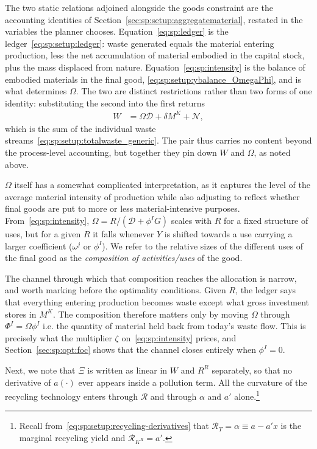 The two static relations adjoined alongside the goods constraint are the accounting identities of Section~\ref{sec:sp:setup:aggregatematerial}, restated in the variables the planner chooses. Equation~\eqref{eq:sp:ledger} is the ledger~\eqref{eq:sp:setup:ledger}: waste generated equals the material entering production, less the net accumulation of material embodied in the capital stock, plus the mass displaced from nature. Equation~\eqref{eq:sp:intensity} is the balance of embodied materials in the final good, \eqref{eq:sp:setup:ybalance_OmegaPhi}, and is what determines $\Omega$. The two are distinct restrictions rather than two forms of one identity: substituting the second into the first returns
\begin{align}
W &= \Omega\mathcal D+\delta M^K+\mathcal N,
\label{eq:sp:ledger-streams}
\end{align}
which is the sum of the individual waste streams~\eqref{eq:sp:setup:totalwaste_generic}. The pair thus carries no content beyond the process-level accounting, but together they pin down $W$ and $\Omega$, as noted above.

$\Omega$ itself has a somewhat complicated interpretation, as it captures the level of the average material intensity of production while also adjusting to reflect whether final goods are put to more or less material-intensive purposes. From~\eqref{eq:sp:intensity}, $\Omega=R/\left(\mathcal D+\phi^IG\right)$ scales with $R$ for a fixed structure of uses, but for a given $R$ it falls whenever $Y$ is shifted towards a use carrying a larger coefficient ($\omega^j$ or $\phi^I$). We refer to the relative sizes of the different uses of the final good as the \textit{composition of activities/uses} of the good.

The channel through which that composition reaches the allocation is narrow, and worth marking before the optimality conditions. Given $R$, the ledger says that everything entering production becomes waste except what gross investment stores in $M^K$. The composition therefore matters only by moving $\Omega$ through $\Phi^I=\Omega\phi^I$ i.e. the quantity of material held back from today's waste flow. This is precisely what the multiplier $\zeta$ on~\eqref{eq:sp:intensity} prices, and Section~\ref{sec:sp:opt:foc} shows that the channel closes entirely when $\phi^I=0$.


Next, we note that $\Xi$ is written as linear in $W$ and $R^R$ separately, so that no derivative of $a(\cdot)$ ever appears inside a pollution term. All the curvature of the recycling
technology enters through $\mathcal R$ and through $\alpha$ and $a'$ alone.\footnote{Recall
from~\eqref{eq:sp:setup:recycling-derivatives} that $\mathcal R_T=\alpha\equiv a-a'x$ is the marginal
recycling yield and $\mathcal R_{K^R}=a'$.}



